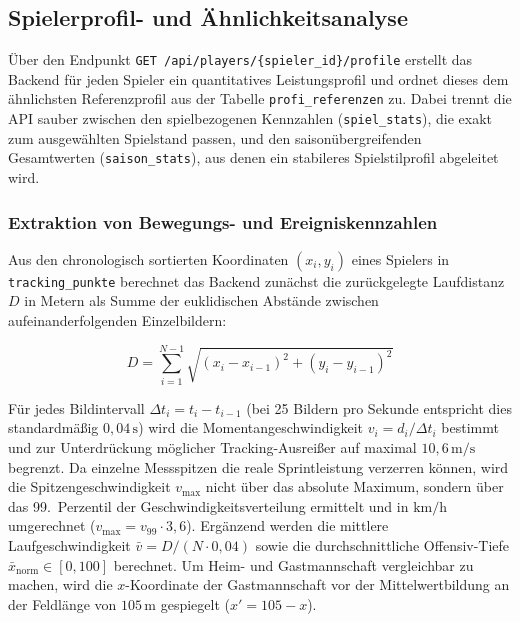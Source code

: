 \subsection{Spielerprofil- und Ähnlichkeitsanalyse}
\label{sec:spielerprofil}

Über den Endpunkt \texttt{GET /api/players/\{spieler\_id\}/profile} erstellt
das Backend für jeden Spieler ein quantitatives Leistungsprofil und ordnet
dieses dem ähnlichsten Referenzprofil aus der Tabelle
\texttt{profi\_referenzen} zu. Dabei trennt die API sauber zwischen den
spielbezogenen Kennzahlen (\texttt{spiel\_stats}), die exakt zum ausgewählten
Spielstand passen, und den saisonübergreifenden Gesamtwerten
(\texttt{saison\_stats}), aus denen ein stabileres Spielstilprofil abgeleitet
wird.

\subsubsection{Extraktion von Bewegungs- und Ereigniskennzahlen}

Aus den chronologisch sortierten Koordinaten $(x_i, y_i)$ eines Spielers in
\texttt{tracking\_punkte} berechnet das Backend zunächst die zurückgelegte
Laufdistanz $D$ in Metern als Summe der euklidischen Abstände zwischen
aufeinanderfolgenden Einzelbildern:

\begin{equation}
    D = \sum_{i=1}^{N-1} \sqrt{(x_i - x_{i-1})^2 + (y_i - y_{i-1})^2}
    \label{eq:laufdistanz}
\end{equation}

Für jedes Bildintervall $\Delta t_i = t_i - t_{i-1}$ (bei 25 Bildern pro
Sekunde entspricht dies standardmäßig $0{,}04\,\mathrm{s}$) wird die
Momentangeschwindigkeit $v_i = d_i / \Delta t_i$ bestimmt und zur Unterdrückung
möglicher Tracking-Ausreißer auf maximal $10{,}6\,\mathrm{m/s}$ begrenzt. Da
einzelne Messspitzen die reale Sprintleistung verzerren können, wird die
Spitzengeschwindigkeit $v_{\max}$ nicht über das absolute Maximum, sondern über
das 99.~Perzentil der Geschwindigkeitsverteilung ermittelt und in
$\mathrm{km/h}$ umgerechnet ($v_{\max} = v_{99} \cdot 3{,}6$). Ergänzend werden
die mittlere Laufgeschwindigkeit $\bar{v} = D / (N \cdot 0{,}04)$ sowie die
durchschnittliche Offensiv-Tiefe $\bar{x}_{\mathrm{norm}} \in [0, 100]$
berechnet. Um Heim- und Gastmannschaft vergleichbar zu machen, wird die
$x$-Koordinate der Gastmannschaft vor der Mittelwertbildung an der Feldlänge
von $105\,\mathrm{m}$ gespiegelt ($x' = 105 - x$).

